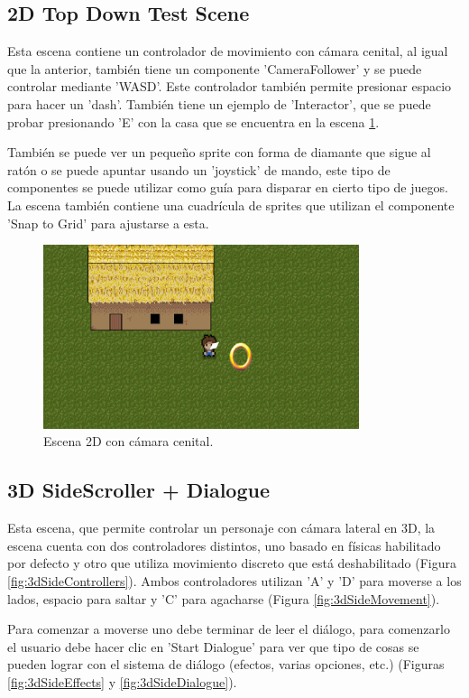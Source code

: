 \subsection{2D Top Down Test Scene}
Esta escena contiene un controlador de movimiento con cámara cenital, al igual que la anterior, también tiene un componente 'CameraFollower' y se puede
controlar mediante 'WASD'. Este controlador también permite presionar espacio para hacer un 'dash'. También tiene un ejemplo de 'Interactor', que se puede
 probar presionando 'E' con la casa que se encuentra en la escena \ref{fig:2dtopDown}. 
 
 También se puede ver un pequeño sprite con forma de diamante que sigue 
 al ratón o se puede apuntar usando un 'joystick' de mando, este tipo de componentes se puede utilizar como guía para disparar en cierto tipo de juegos. La 
 escena también contiene una cuadrícula de sprites que utilizan el componente 'Snap to Grid' para ajustarse a esta.

\begin{figure}[H]
   \centering
     \includegraphics[width=350px,clip=true]{2dTopDownControllerTestScene.png}
   \caption{Escena 2D con cámara cenital.}
   \label{fig:2dtopDown}
\end{figure}

\subsection{3D SideScroller + Dialogue}
Esta escena, que permite controlar un personaje con cámara lateral en 3D, la escena cuenta con dos controladores distintos, uno basado en físicas habilitado por 
defecto y otro que utiliza movimiento discreto que está deshabilitado (Figura \ref{fig:3dSideControllers}). Ambos controladores utilizan 'A' y 'D' para moverse a los 
lados, espacio para saltar y 'C' para agacharse (Figura \ref{fig:3dSideMovement}). 

Para comenzar a moverse uno debe terminar de leer el diálogo, para 
comenzarlo el usuario debe hacer clic en 'Start Dialogue' para ver que tipo de cosas se pueden lograr con el sistema de diálogo (efectos, varias opciones, 
etc.) (Figuras \ref{fig:3dSideEffects} y \ref{fig:3dSideDialogue}). 

